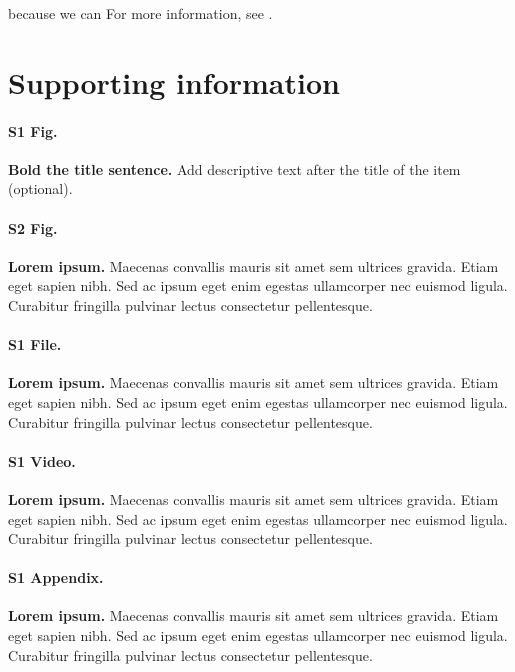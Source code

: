 \documentclass[10pt,letterpaper]{article}
\begin{document}
\begin{itemize}
because we can For more information, see .

\section*{Supporting information}

\paragraph*{S1 Fig.}
\label{S1_Fig}
{\bf Bold the title sentence.} Add descriptive text after the title of the item (optional).

\paragraph*{S2 Fig.}
\label{S2_Fig}
{\bf Lorem ipsum.} Maecenas convallis mauris sit amet sem ultrices gravida. Etiam eget sapien nibh. Sed ac ipsum eget enim egestas ullamcorper nec euismod ligula. Curabitur fringilla pulvinar lectus consectetur pellentesque.

\paragraph*{S1 File.}
\label{S1_File}
{\bf Lorem ipsum.}  Maecenas convallis mauris sit amet sem ultrices gravida. Etiam eget sapien nibh. Sed ac ipsum eget enim egestas ullamcorper nec euismod ligula. Curabitur fringilla pulvinar lectus consectetur pellentesque.

\paragraph*{S1 Video.}
\label{S1_Video}
{\bf Lorem ipsum.}  Maecenas convallis mauris sit amet sem ultrices gravida. Etiam eget sapien nibh. Sed ac ipsum eget enim egestas ullamcorper nec euismod ligula. Curabitur fringilla pulvinar lectus consectetur pellentesque.

\paragraph*{S1 Appendix.}
\label{S1_Appendix}
{\bf Lorem ipsum.} Maecenas convallis mauris sit amet sem ultrices gravida. Etiam eget sapien nibh. Sed ac ipsum eget enim egestas ullamcorper nec euismod ligula. Curabitur fringilla pulvinar lectus consectetur pellentesque.


\end{itemize}
\end{document}
